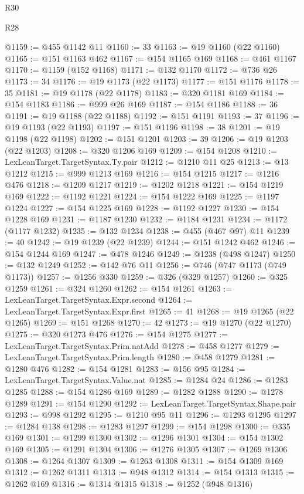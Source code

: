 \begin{lexlean}{R30}
\begin{lexlean}{R28}
\begin{coremodule}
{{{{{{{{{{{{{{{{{{{{{{{{{{{{{{{{{{{{{{{{{{{{{{{{{{{{{{{{{{{{{{{{{{{{{{{{{{{{{{{{{{{{{{{{{{{{{{{{{{{{{{{{{{{{{{{{{{{{{{{{{{{{{{{{{{{{{{{{{{{{{{{@1159 := @455 @1142 @11
@1160 := 33
@1163 := @19 @1160 (@22 @1160)
@1165 := @151 @1163 @462
@1167 := @154 @1165 @169
@1168 := @461 @1167
@1170 := @1159 (@152 @1168)
@1171 := @132 @1170
@1172 := @736 @26
@1173 := 34
@1176 := @19 @1173 (@22 @1173)
@1177 := @151 @1176
@1178 := 35
@1181 := @19 @1178 (@22 @1178)
@1183 := @320 @1181 @169
@1184 := @154 @1183
@1186 := @999 @26 @169
@1187 := @154 @1186
@1188 := 36
@1191 := @19 @1188 (@22 @1188)
@1192 := @151 @1191
@1193 := 37
@1196 := @19 @1193 (@22 @1193)
@1197 := @151 @1196
@1198 := 38
@1201 := @19 @1198 (@22 @1198)
@1202 := @151 @1201
@1203 := 39
@1206 := @19 @1203 (@22 @1203)
@1208 := @320 @1206 @169
@1209 := @154 @1208
@1210 := LexLeanTarget.TargetSyntax.Ty.pair
@1212 := @1210 @11 @25
@1213 := @13 @1212
@1215 := @999 @1213 @169
@1216 := @154 @1215
@1217 := @1216 @476
@1218 := @1209 @1217
@1219 := @1202 @1218
@1221 := @154 @1219 @169
@1222 := @1192 @1221
@1224 := @154 @1222 @169
@1225 := @1197 @1224
@1227 := @154 @1225 @169
@1228 := @1192 @1227
@1230 := @154 @1228 @169
@1231 := @1187 @1230
@1232 := @1184 @1231
@1234 := @1172 (@1177 @1232)
@1235 := @132 @1234
@1238 := @455 (@467 @97) @11
@1239 := 40
@1242 := @19 @1239 (@22 @1239)
@1244 := @151 @1242 @462
@1246 := @154 @1244 @169
@1247 := @478 @1246
@1249 := @1238 (@498 @1247)
@1250 := @132 @1249
@1252 := @142 @76 @11
@1256 := @746 (@747 @1173 (@749 @1173))
@1257 := @1256 @330
@1259 := @326 (@329 @1257)
@1260 := @325 @1259
@1261 := @324 @1260
@1262 := @154 @1261
@1263 := LexLeanTarget.TargetSyntax.Expr.second
@1264 := LexLeanTarget.TargetSyntax.Expr.first
@1265 := 41
@1268 := @19 @1265 (@22 @1265)
@1269 := @151 @1268
@1270 := 42
@1273 := @19 @1270 (@22 @1270)
@1275 := @320 @1273 @476
@1276 := @154 @1275
@1277 := LexLeanTarget.TargetSyntax.Prim.natAdd
@1278 := @458 @1277
@1279 := LexLeanTarget.TargetSyntax.Prim.length
@1280 := @458 @1279
@1281 := @1280 @476
@1282 := @154 @1281
@1283 := @156 @95
@1284 := LexLeanTarget.TargetSyntax.Value.nat
@1285 := @1284 @24
@1286 := @1283 @1285
@1288 := @154 @1286 @169
@1289 := @1282 @1288
@1290 := @1278 @1289
@1291 := @154 @1290
@1292 := LexLeanTarget.TargetSyntax.Shape.pair
@1293 := @998 @1292
@1295 := @1210 @95 @11
@1296 := @1293 @1295
@1297 := @1284 @138
@1298 := @1283 @1297
@1299 := @154 @1298
@1300 := @335 @169
@1301 := @1299 @1300
@1302 := @1296 @1301
@1304 := @154 @1302 @169
@1305 := @1291 @1304
@1306 := @1276 @1305
@1307 := @1269 @1306
@1308 := @1264 @1307
@1309 := @1263 @1308
@1311 := @154 @1309 @169
@1312 := @1262 @1311
@1313 := @948 @1312
@1314 := @154 @1313
@1315 := @1262 @169
@1316 := @1314 @1315
@1318 := @1252 (@948 @1316)
}}}}}}}}}}}}}}}}}}}}}}}}}}}}}}}}}}}}}}}}}}}}}}}}}}}}}}}}}}}}}}}}}}}}}}}}}}}}}}}}}}}}}}}}}}}}}}}}}}}}}}}}}}}}}}}}}}}}}}}}}}}}}}}}}}}}}}}}}}}}}}}
\end{coremodule}
\end{lexlean}
\end{lexlean}
